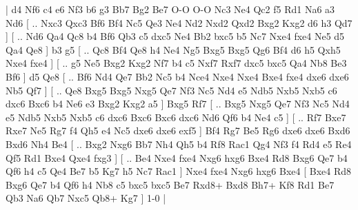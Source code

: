 \makegametitle 
|   d4   Nf6    c4   e6    Nf3   b6    g3   Bb7    Bg2   Be7    O-O   O-O    Nc3   Ne4    Qc2   f5    Rd1   Na6    a3   Nd6 [ .. Nxc3  Qxc3 Bf6  Bf4 Nc5  Qe3 Ne4  Nd2 Nxd2  Qxd2 Bxg2  Kxg2 d6  h3 Qd7   ]  [ .. Nd6  Qa4 Qc8  b4 Bf6  Qb3 c5  dxc5 Ne4  Bb2 bxc5  b5 Nc7  Nxe4 fxe4  Ne5 d5  Qa4 Qe8   ]  b3   g5    [ .. Qc8  Bf4 Qe8  h4 Ne4  Ng5 Bxg5  Bxg5 Qg6  Bf4 d6  h5 Qxh5  Nxe4 fxe4   ]  [ .. g5  Ne5 Bxg2  Kxg2 Nf7  b4 c5  Nxf7 Rxf7  dxc5 bxc5  Qa4 Nb8  Be3 Bf6   ]  d5   Qe8 [ .. Bf6  Nd4 Qe7  Bb2 Nc5  b4 Nce4  Nxe4 Nxe4  Bxe4 fxe4  dxe6 dxe6  Nb5 Qf7   ]  [ .. Qe8  Bxg5 Bxg5  Nxg5 Qe7  Nf3 Nc5  Nd4 e5  Ndb5 Nxb5  Nxb5 c6  dxc6 Bxc6  b4 Ne6  e3 Bxg2  Kxg2 a5   ]  Bxg5   Rf7 [ .. Bxg5  Nxg5 Qe7  Nf3 Nc5  Nd4 e5  Ndb5 Nxb5  Nxb5 c6  dxc6 Bxc6  Bxc6 dxc6  Nd6 Qf6  b4 Ne4  c5   ]  [ .. Rf7  Bxe7 Rxe7  Ne5 Rg7  f4 Qh5  e4 Nc5  dxe6 dxe6  exf5   ]  Bf4   Rg7    Be5   Rg6    dxe6   dxe6    Bxd6   Bxd6    Nh4   Be4 [ .. Bxg2  Nxg6 Bb7  Nh4 Qh5  b4 Rf8  Rac1 Qg4  Nf3 f4  Rd4 e5  Re4 Qf5  Rd1 Bxe4  Qxe4 fxg3   ]  [ .. Be4  Nxe4 fxe4  Nxg6 hxg6  Bxe4 Rd8  Bxg6 Qe7  b4 Qf6  h4 c5  Qe4 Be7  b5 Kg7  h5 Nc7  Rac1   ]  Nxe4   fxe4    Nxg6   hxg6    Bxe4    [  Bxe4 Rd8  Bxg6 Qe7  b4 Qf6  h4 Nb8  c5 bxc5  bxc5 Be7  Rxd8+ Bxd8  Bh7+ Kf8  Rd1 Be7  Qb3 Na6  Qb7 Nxc5  Qb8+ Kg7   ] 1-0  |
